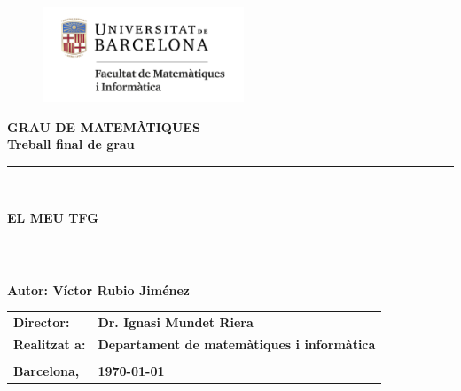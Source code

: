 \documentclass[11pt,a4paper,openright,oneside]{book}
\numberwithin{equation}{section}
\theoremstyle{definition}
\begin{document}

\thispagestyle{empty}

\begin{titlepage}
\begin{center}
\begin{figure}[htb]
\begin{center}
\includegraphics[width=6cm]{matematiquesinformatica-pos-rgb.png}
\end{center}
\end{figure}

\vspace*{1cm}
\textbf{\LARGE GRAU DE MATEM\`{A}TIQUES } \\
\vspace*{.5cm}
\textbf{\LARGE Treball final de grau} \\

\vspace*{1.5cm}
\rule{16cm}{0.1mm}\\
\begin{Huge}
\textbf{EL MEU TFG} \\
\end{Huge}
\rule{16cm}{0.1mm}\\

\vspace{1cm}

\begin{flushright}
\textbf{\LARGE Autor: Víctor Rubio Jiménez}

\vspace*{2cm}

\renewcommand{\arraystretch}{1.5}
\begin{tabular}{ll}
\textbf{\Large Director:} & \textbf{\Large Dr. Ignasi Mundet Riera } \\
\textbf{\Large Realitzat a:} & \textbf{\Large  Departament de matemàtiques i informàtica   } \\
\\
\textbf{\Large Barcelona,} & \textbf{\Large \today }
\end{tabular}
\end{flushright}
\end{center}
\end{titlepage}
\end{document}
